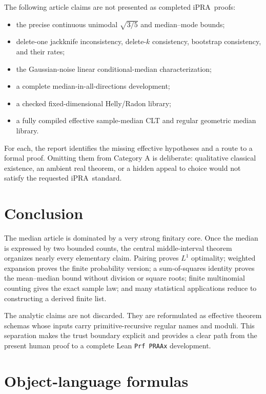 \documentclass[11pt]{article}
\newcommand{\iPRA}{\ensuremath{\mathrm{iPRA}}}
\begin{document}
The following article claims are not presented as completed \iPRA\ proofs:

\begin{itemize}
\item the precise continuous unimodal $\sqrt{3/5}$ and median--mode bounds;
\item delete-one jackknife inconsistency, delete-$k$ consistency, bootstrap
consistency, and their rates;
\item the Gaussian-noise linear conditional-median characterization;
\item a complete median-in-all-directions development;
\item a checked fixed-dimensional Helly/Radon library;
\item a fully compiled effective sample-median CLT and regular geometric
median library.
\end{itemize}

For each, the report identifies the missing effective hypotheses and a route
to a formal proof.  Omitting them from Category A is deliberate: qualitative
classical existence, an ambient real theorem, or a hidden appeal to choice
would not satisfy the requested \iPRA\ standard.

\section{Conclusion}

The median article is dominated by a very strong finitary core.  Once the
median is expressed by two bounded counts, the central middle-interval theorem
organizes nearly every elementary claim.  Pairing proves $L^1$ optimality;
weighted expansion proves the finite probability version; a sum-of-squares
identity proves the mean--median bound without division or square roots;
finite multinomial counting gives the exact sample law; and many statistical
applications reduce to constructing a derived finite list.

The analytic claims are not discarded.  They are reformulated as effective
theorem schemas whose inputs carry primitive-recursive regular names and
moduli.  This separation makes the trust boundary explicit and provides a
clear path from the present human proof to a complete Lean
\texttt{Prf PRAAx} development.

\appendix
\section{Object-language formulas}
\end{document}

